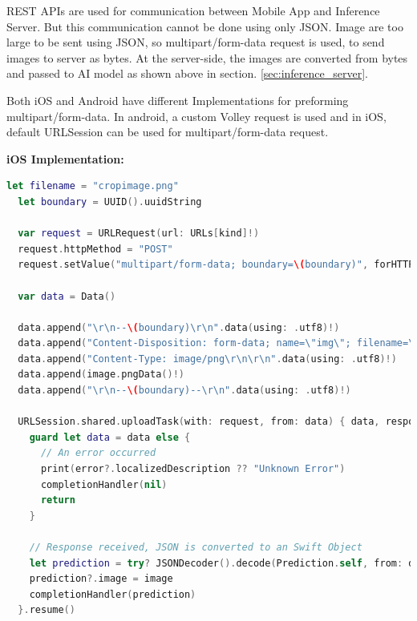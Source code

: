 \documentclass[../Report.tex]{subfiles}
\begin{document}
REST APIs are used for communication between Mobile App and Inference Server. But this communication cannot be done using only JSON.
Image are too large to be sent using JSON, so multipart/form-data request is used, to send images to server as bytes. At the server-side,
the images are converted from bytes and passed to AI model as shown above in section. \ref{sec:inference_server}.\par

Both iOS and Android have different Implementations for preforming multipart/form-data. In android, a custom Volley\cite{volloy} request 
is used and in iOS, default URLSession can be used for multipart/form-data request.\par

\noindent \textbf{iOS Implementation:}

\begin{lstlisting}[language=swift,caption={iOS multipart/form-data request Implementation},captionpos=b]
  let filename = "cropimage.png"
  let boundary = UUID().uuidString
        
  var request = URLRequest(url: URLs[kind]!)
  request.httpMethod = "POST"
  request.setValue("multipart/form-data; boundary=\(boundary)", forHTTPHeaderField: "Content-Type")
        
  var data = Data()
        
  data.append("\r\n--\(boundary)\r\n".data(using: .utf8)!)
  data.append("Content-Disposition: form-data; name=\"img\"; filename=\"\(filename)\"\r\n".data(using: .utf8)!)
  data.append("Content-Type: image/png\r\n\r\n".data(using: .utf8)!)
  data.append(image.pngData()!)
  data.append("\r\n--\(boundary)--\r\n".data(using: .utf8)!)
        
  URLSession.shared.uploadTask(with: request, from: data) { data, response, error in
    guard let data = data else {
      // An error occurred
      print(error?.localizedDescription ?? "Unknown Error")
      completionHandler(nil)
      return
    }
    
    // Response received, JSON is converted to an Swift Object
    let prediction = try? JSONDecoder().decode(Prediction.self, from: data)
    prediction?.image = image
    completionHandler(prediction)
  }.resume()
\end{lstlisting}
\end{document}
